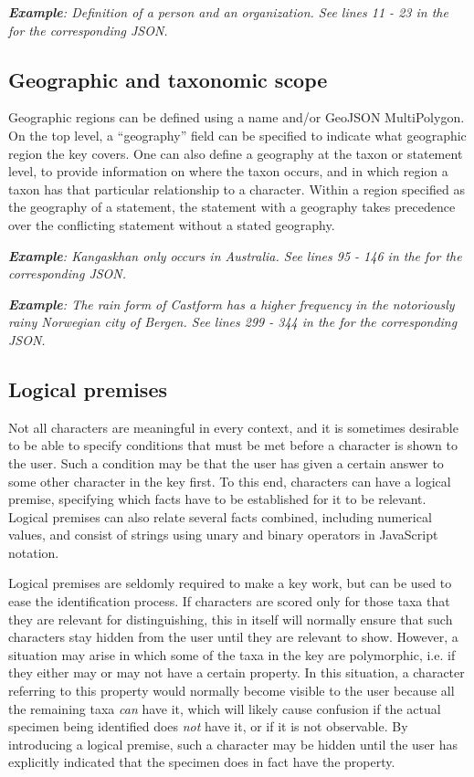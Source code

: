 \documentclass[10pt,letterpaper]{article}
\begin{document}
\textit{\textbf{Example}: Definition of a person and an organization. See lines 11 - 23 in the  for the corresponding JSON.}
\subsection*{
Geographic and taxonomic scope
}
Geographic regions can be defined using a name and/or GeoJSON MultiPolygon. On the top level, a ``geography'' field can be specified to indicate what geographic region the key covers. One can also define a geography at the taxon or statement level, to provide information on where the taxon occurs, and in which region a taxon has that particular relationship to a character. Within a region specified as the geography of a statement, the statement with a geography takes precedence over the conflicting statement without a stated geography.

\textit{\textbf{Example}: Kangaskhan only occurs in Australia. See lines 95 - 146 in the  for the corresponding JSON.}

\textit{\textbf{Example}: The rain form of Castform has a higher frequency in the notoriously rainy Norwegian city of Bergen. See lines 299 - 344 in the  for the corresponding JSON.}
\subsection*{
Logical premises
}
Not all characters are meaningful in every context, and it is sometimes desirable to be able to specify conditions that must be met before a character is shown to the user. Such a condition may be that the user has given a certain answer to some other character in the key first. To this end, characters can have a logical premise, specifying which facts have to be established for it to be relevant. Logical premises can also relate several facts combined, including numerical values, and consist of strings using unary and binary operators in JavaScript notation.

Logical premises are seldomly required to make a key work, but can be used to ease the identification process. If characters are scored only for those taxa that they are relevant for distinguishing, this in itself will normally ensure that such characters stay hidden from the user until they are relevant to show. However, a situation may arise in which some of the taxa in the key are polymorphic, i.e. if they either may or may not have a certain property. In this situation, a character referring to this property would normally become visible to the user because all the remaining taxa \textit{can} have it, which will likely cause confusion if the actual specimen being identified does \textit{not} have it, or if it is not observable. By introducing a logical premise, such a character may be hidden until the user has explicitly indicated that the specimen does in fact have the property.
\end{document}
